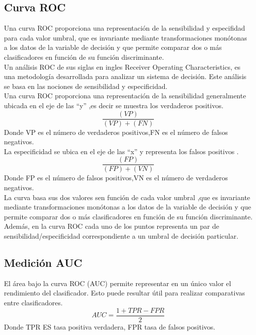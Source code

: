 \documentclass[10pt,a4paper]{article}
\begin{document}
\subsection{Curva ROC}
Una curva ROC proporciona una representación de la sensibilidad y especifidad para cada valor umbral, que es invariante mediante transformaciones monótonas a los datos de la variable de decisión y que permite comparar dos o más clasificadores en función de su función discriminante.\\
Un análisis ROC de sus siglas en ingles Receiver Operating Characteristics, es una metodología desarrollada para analizar un sistema de decisión. Este análisis se basa en las nociones de sensibilidad y especificidad.\\
Una curva ROC proporciona una representación de la sensibilidad generalmente ubicada en el eje de las “y” ,es decir se muestra los verdaderos positivos.
\begin{equation}
 \frac{(VP)}{ (VP)+  (FN)}
\end{equation}
Donde VP es el número de verdaderos positivos,FN es el número de falsos negativos.\\
La especificidad se ubica en el eje de las “x” y representa los falsos positivos .
\begin{equation}
 \frac{(FP)}{ (FP)+  (VN)}
\end{equation}
Donde FP es el número de falsos positivos,VN es el número de verdaderos negativos.\\
La curva basa sus dos valores sen función de cada valor umbral ,que es invariante mediante transformaciones monótonas a los datos de la variable de decisión y que permite comparar dos o más clasificadores en función de su función discriminante.
Además, en la curva ROC cada uno de los puntos representa un par de sensibilidad/especificidad correspondiente a un umbral de decisión particular.

\subsection{Medición AUC}
El área bajo la curva ROC (AUC) permite representar
en un único valor el rendimiento del clasificador. Esto
puede resultar útil para realizar comparativas entre
clasificadores.
\begin{equation}
AUC = \frac{1+TPR-FPR}{2}
\label{eq:acc}
\end{equation}
Donde TPR ES tasa positiva verdadera, FPR tasa de falsos positivos.\\
\end{document}
